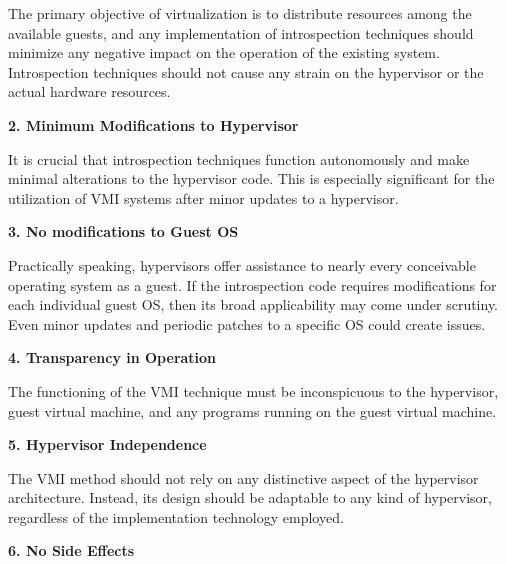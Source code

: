 \documentclass{report}
\begin{document}
\begin{spacing}{1.5}
{\large
\noindent The primary objective of virtualization is to distribute resources among the available guests, and any implementation of introspection techniques should minimize any negative impact on the operation of the existing system. Introspection techniques should not cause any strain on the hypervisor or the actual hardware resources.
\leavevmode\newline
}



{\large
\noindent \textbf{2. Minimum Modifications to Hypervisor}
\leavevmode\newline
}

{\large
\noindent It is crucial that introspection techniques function autonomously and make minimal alterations to the hypervisor code. This is especially significant for the utilization of VMI systems after minor updates to a hypervisor.  
\newline
}


{\large
\noindent \textbf{3. No modifications to Guest OS}
\leavevmode\newline
}

{\large
\noindent Practically speaking, hypervisors offer assistance to nearly every conceivable operating system as a guest. If the introspection code requires modifications for each individual guest OS, then its broad applicability may come under scrutiny. Even minor updates and periodic patches to a specific OS could create issues.
\newline
}

    
{\large
\noindent \textbf{4. Transparency in Operation}
\leavevmode\newline
}

{\large
\noindent The functioning of the VMI technique must be inconspicuous to the hypervisor, guest virtual machine, and any programs running on the guest virtual machine.
\newline
}


{\large
\noindent \textbf{5. Hypervisor Independence}
\leavevmode\newline
}

{\large
\noindent The VMI method should not rely on any distinctive aspect of the hypervisor architecture. Instead, its design should be adaptable to any kind of hypervisor, regardless of the implementation technology employed.
\newline
}


{\large
\noindent \textbf{6. No Side Effects}
\leavevmode\newline
}


\end{spacing}
\end{document}
